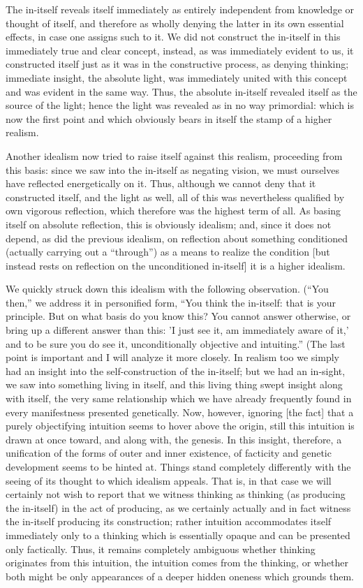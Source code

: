 The in-itself reveals itself immediately
as entirely independent from knowledge or thought of itself,
and therefore as wholly denying the latter
in its own essential effects, in case one assigns such to it.
We did not construct the in-itself
in this immediately true and clear concept,
instead, as was immediately evident to us,
it constructed itself just as it was
in the constructive process, as denying thinking;
immediate insight, the absolute light, was
immediately united with this concept
and was evident in the same way.
Thus, the absolute in-itself revealed itself
as the source of the light;
hence the light was revealed
as in no way primordial:
which is now the first point
and which obviously bears in itself
the stamp of a higher realism.

Another idealism now tried to raise itself
against this realism, proceeding from this basis:
since we saw into the in-itself as negating vision,
we must ourselves have reflected energetically on it.
Thus, although we cannot deny that it constructed itself,
and the light as well, all of this was nevertheless
qualified by own vigorous reflection,
which therefore was the highest term of all.
As basing itself on absolute reflection,
this is obviously idealism;
and, since it does not depend,
as did the previous idealism,
on reflection about something conditioned
(actually carrying out a “through”)
as a means to realize the condition
[but instead rests on reflection
on the unconditioned in-itself]
it is a higher idealism.

We quickly struck down this idealism
with the following observation.
(“You then,” we address it in personified form,
“You think the in-itself: that is your principle.
But on what basis do you know this?
You cannot answer otherwise,
or bring up a different answer than this:
'I just see it, am immediately aware of it,'
and to be sure you do see it,
unconditionally objective and intuiting.”
(The last point is important and I will analyze it more closely.
In realism too we simply had an insight
into the self-construction of the in-itself;
but we had an in-sight, we saw into something living in itself,
and this living thing swept insight along with itself,
the very same relationship which we have already frequently found
in every manifestness presented genetically.
Now, however, ignoring [the fact] that
a purely objectifying intuition seems
to hover above the origin,
still this intuition is drawn at once toward,
and along with, the genesis.
In this insight, therefore,
a unification of the forms
of outer and inner existence,
of facticity and genetic development
seems to be hinted at.
Things stand completely differently with the seeing of
its thought to which idealism appeals.
That is, in that case we will certainly
not wish to report that we witness thinking as thinking
(as producing the in-itself)
in the act of producing, as we certainly actually and in fact witness
the in-itself producing its construction;
rather intuition accommodates itself immediately only to
a thinking which is essentially opaque
and can be presented only factically.
Thus, it remains completely ambiguous
whether thinking originates from this intuition,
the intuition comes from the thinking,
or whether both might be only appearances
of a deeper hidden oneness which grounds them.


